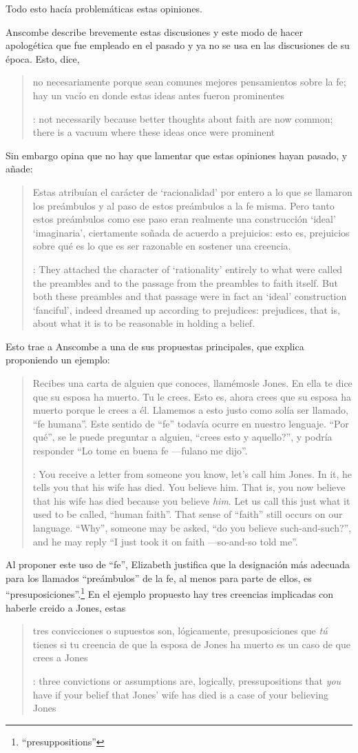 Todo esto hacía problemáticas estas opiniones.

Anscombe describe brevemente estas discusiones y este modo de hacer apologética que fue empleado en el pasado y ya no se usa en las discusiones de su época. Esto, dice, \blockquote[{\cite[114]{anscombe1981erp:faith}}: not necessarily because better thoughts about faith are now common; there is a vacuum where these ideas once were prominent]{no necesariamente porque sean comunes mejores pensamientos sobre la fe; hay un vacío en donde estas ideas antes fueron prominentes}. Sin embargo opina que no hay que lamentar que estas opiniones hayan pasado, y añade: \blockquote[{\cite[114]{anscombe1981erp:faith}}: They attached the character of `rationality' entirely to what were called the preambles and to the passage from the preambles to faith itself. But both these preambles and that passage were in fact an `ideal' construction \textelp{} `fanciful', indeed dreamed up according to prejudices: prejudices, that is, about what it is to be reasonable in holding a belief.]{Estas atribuían el carácter de `racionalidad' por entero a lo que se llamaron los preámbulos y al paso de estos preámbulos a la fe misma. Pero tanto estos preámbulos como ese paso eran realmente una construcción `ideal' \textelp{} `imaginaria', ciertamente soñada de acuerdo a prejuicios: esto es, prejuicios sobre qué es lo que es ser razonable en sostener una creencia.}

Esto trae a Anscombe a una de sus propuestas principales, que explica proponiendo un ejemplo: \blockquote[{\cite[114]{anscombe1981erp:faith}}: You receive a letter from someone you know, let's call him Jones. In it, he tells you that his wife has died. You believe him. That is, you now believe that his wife has died because you believe \emph{him}. Let us call this just what it used to be called, ``human faith''. That sense of ``faith'' still occurs on our language. ``Why'', someone may be asked, ``do you believe such-and-such?'', and he may reply ``I just took it on faith ---so-and-so told me''.]{Recibes una carta de alguien que conoces, llamémosle Jones. En ella te dice que su esposa ha muerto. Tu le crees. Esto es, ahora crees que su esposa ha muerto porque le crees a él. Llamemos a esto justo como solía ser llamado, ``fe humana''. Este sentido de ``fe'' todavía ocurre en nuestro lenguaje. ``Por qué'', se le puede preguntar a alguien, ``crees esto y aquello?'', y podría responder ``Lo tome en buena fe ---fulano me dijo''.} Al proponer este uso de ``fe'', Elizabeth justifica que la designación más adecuada para los llamados ``preámbulos'' de la fe, al menos para parte de ellos, es ``presuposiciones''.\footnote{``presuppositions''} En el ejemplo propuesto hay tres creencias implicadas con haberle creido a Jones, estas \blockquote[{\cite[114]{anscombe1981erp:faith}}: three convictions or assumptions are, logically, pressupositions that \emph{you} have if your belief that Jones' wife has died is a case of your believing Jones]{tres convicciones o supuestos son, lógicamente, presuposiciones que \emph{tú} tienes si tu creencia de que la esposa de Jones ha muerto es un caso de que crees a Jones}.

